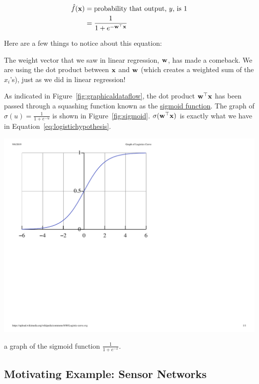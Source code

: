 \documentclass[assignment03_Solutions]{subfiles}
\begin{document}
\begin{align}
\hat{f}(\mathbf{x}) &= \mbox{probability that output, $y$, is 1} \nonumber \\
&=\frac{1}{1 + e^{-\mathbf{w}^\top \mathbf{x}}} \label{eq:logistichypothesis}
\end{align}

Here are a few things to notice about this equation:
\be
\item The weight vector that we saw in linear regression, $\mathbf{w}$, has made a comeback. We are using the dot product between $\mathbf{x}$ and $\mathbf{w}$ (which creates a weighted sum of the $x_i$'s), just as we did in linear regression!
\item As indicated in Figure~\ref{fig:graphicaldataflow}, the dot product $\mathbf{w}^\top \mathbf{x}$ has been passed through a squashing function known as the \href{https://en.wikipedia.org/wiki/Sigmoid_function}{sigmoid function}.  The graph of $\sigma(u) = \frac{1}{1+e^{-u}}$ is shown in Figure~\ref{fig:sigmoid}.  $\sigma( \mathbf{w}^\top \mathbf{x})$ is exactly what we have in Equation~\ref{eq:logistichypothesis}. 

\begin{marginfigure}
\includegraphics[width=\linewidth]{figures/Logistic-curve}
\caption{a graph of the sigmoid function $\frac{1}{1+e^{-x}}$.}\label{fig:sigmoid}
\end{marginfigure}
\ee

\subsection{Motivating Example: Sensor Networks}
\end{document}
